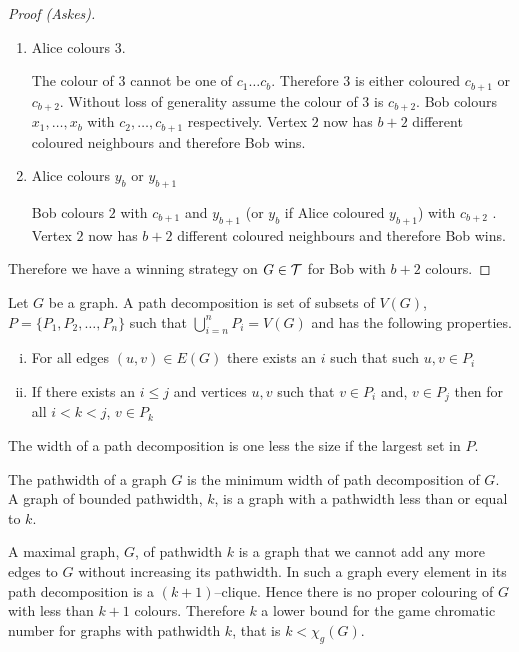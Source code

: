 \begin{proof}[Proof (Askes)]
\begin{enumerate}
        \item Alice colours $3$.
               
        The colour of $3$ cannot be one of $c_1 \ldots c_{b}$. Therefore $3$ is either coloured $c_{b+1}$ or $c_{b+2}$. 
        Without loss of generality assume the colour of $3$ is $c_{b+2}$.
        Bob colours $x_1, \dots ,x_{b}$ with $c_2,\dots,c_{b+1}$ respectively.
        Vertex $2$ now has $b+2$ different coloured neighbours and therefore Bob wins.  
                       
        \item Alice colours $y_{b}$ or $y_{b+1}$
        
        Bob colours $2$ with $c_{b+1}$ and $y_{b+1}$ (or $y_{b}$ if Alice coloured $y_{b+1}$) with $c_{b+2}$ .
        Vertex $2$ now has $b+2$ different coloured neighbours and therefore Bob wins. 
    \end{enumerate}

    Therefore we have a winning strategy on $G \in\mathcal{T}$ for Bob with $b+2$ colours. 
\end{proof}

\begin{definition}
    Let $G$ be a graph. A path decomposition is set of subsets of $V(G)$, $P=\{P_1,P_2,\dots,P_n\}$ such that $\bigcup_{i=n}^n P_i=V(G)$ and has the following properties.    
    \begin{enumerate}[(i)]
        \item For all edges $(u,v) \in E(G)$ there exists an $i$ such that such $u,v\in P_i$
        \item If there exists an $i\leq j$ and vertices $u,v$ such that $v\in P_i$ and, $v\in P_j$ then for all $i<k<j$, $v\in P_k$
    \end{enumerate}
    The width of a path decomposition is one less the size if the largest set in $P$.
\end{definition}

\begin{definition}[Pathwidth]
    The pathwidth of a graph $G$ is the minimum width of path decomposition of $G$.    
    A graph of bounded pathwidth, $k$, is a graph with a pathwidth less than or equal to $k$. 
\end{definition}

A maximal graph, $G$, of pathwidth $k$ is a graph that we cannot add any more edges to $G$ without increasing its pathwidth. In such a graph every element in its path decomposition is a $(k+1)$--clique. Hence there is no proper colouring of $G$ with less than $k+1$ colours. Therefore $k$ a lower bound for the game chromatic number for graphs with pathwidth $k$, that is $k < \chi_g(G) $. 

